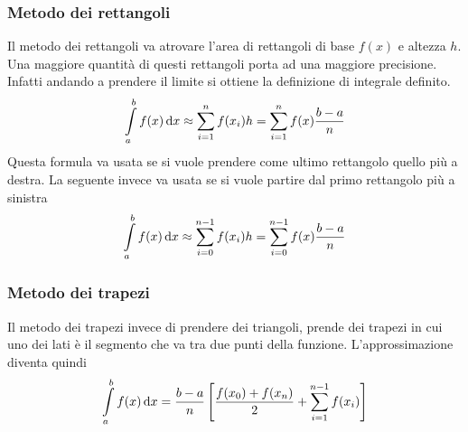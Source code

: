 \subsubsection{Metodo dei rettangoli}
\begin{center}
\end{center}
Il metodo dei rettangoli va atrovare l'area di rettangoli di base $f(x)$ e altezza $h$. Una 
maggiore quantità di questi rettangoli porta ad una maggiore precisione. Infatti andando a prendere
il limite si ottiene la definizione di integrale definito.
\begin{equation*}
  \int\limits_{a}^{b} f(x)\mathop{}\!\mathrm{d} x \approx \sum\limits^{n}_{i=1} f(x_i)h = \sum\limits^{n}_{i=1} f(x)
  \frac{b-a}{n}
\end{equation*}
Questa formula va usata se si vuole prendere come ultimo rettangolo quello più a destra. La 
seguente invece va usata se si vuole partire dal primo rettangolo più a sinistra
\begin{equation*}
  \int\limits_{a}^{b} f(x)\mathop{}\!\mathrm{d} x \approx \sum\limits^{n-1}_{i=0} f(x_i)h = \sum\limits^{n-1}_{i=0} 
  f(x)\frac{b-a}{n}
\end{equation*}

\subsubsection{Metodo dei trapezi}
\begin{center}
\end{center}
Il metodo dei trapezi invece di prendere dei triangoli, prende dei trapezi in cui uno dei lati è
il segmento che va  tra due punti della funzione. L'approssimazione diventa quindi
\begin{equation*}
  \int\limits_{a}^{b} f(x)\mathop{}\!\mathrm{d} x = \frac{b-a}{n}\left[ \frac{f(x_0)+f(x_n)}{2}+
  \sum\limits^{n-1}_{i=1} f(x_i) \right]
\end{equation*}
